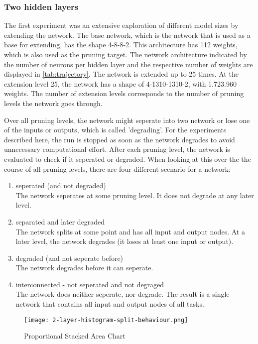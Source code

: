 \subsubsection{Two hidden layers}
The first experiment was an extensive exploration of different model sizes by extending the network.
The base network, which is the network that is used as a base for extending, has the shape 4-8-8-2.
This architecture has 112 weights, which is also used as the pruning target.
The network architecture indicated by the number of neurons per hidden layer and the respective number of weights are displayed in \ref{tab:trajectory}.
The network is extended up to 25 times.
At the extension level 25, the network has a shape of 4-1310-1310-2, with 1.723.960 weights.
The number of extension levels corresponds to the number of pruning levels the network goes through.

Over all pruning levels, the network might seperate into two network or lose one of the inputs or outputs, which is called 'degrading'.
For the experiments described here, the run is stopped as soon as the network degrades to avoid unnecessary computational effort.
After each pruning level, the network is evaluated to check if it seperated or degraded.
When looking at this over the the course of all pruning levels, there are four different scenario for a network:
\begin{enumerate}
    \item seperated (and not degraded)\\
    The network seperates at some pruning level. 
    It does not degrade at any later level. 
    \item separated and later degraded \\
    The network splits at some point and has all input and output nodes.
    At a later level, the network degrades (it loses at least one input or output).
    \item degraded (and not seperate before) \\
    The network degrades before it can seperate.
    \item interconnected - not seperated and not degraged \\
    The network does neither seperate, nor degrade. 
    The result is a single network that contains all input and output nodes of all tasks.
\end{enumerate}
\begin{figure}[ht]
    \centering
    \texttt{[image: 2-layer-histogram-split-behaviour.png]}
    \caption{Proportional Stacked Area Chart}
    \label{fig:2laxer-histogram}
\end{figure}

